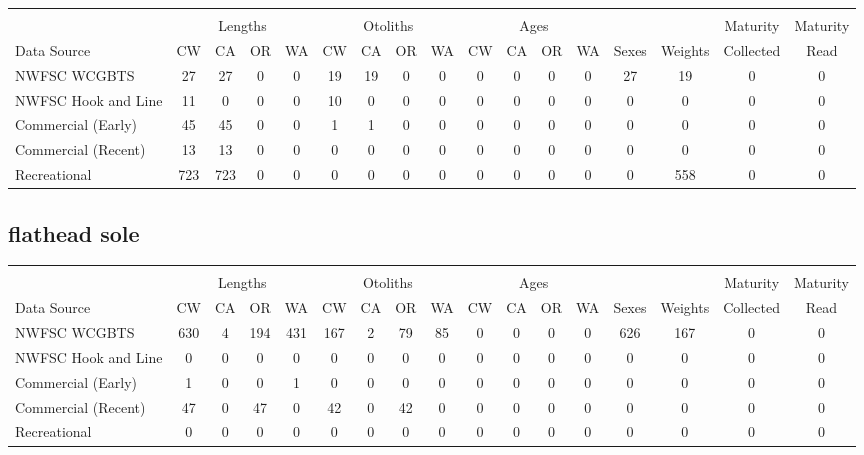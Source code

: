 \documentclass[12pt,]{article}
\begin{document}
\begin{table}[ht]
\centering
\begingroup\fontsize{10pt}{10pt}\selectfont
\begin{tabular}{|l|cccc|cccc|cccc|c|c|c|c|}
  \hline
 &  &  &  &  &  &  &  &  &  &  &  &  &  &  &  &  \\ 
   & \multicolumn{4}{c}{Lengths} &  \multicolumn{4}{c}{Otoliths} & \multicolumn{4}{c}{Ages} &  & & Maturity & Maturity\\
 Data Source & CW & CA & OR & WA & CW & CA & OR & WA & CW & CA & OR & WA & Sexes & Weights & Collected & Read\\
 \hline
NWFSC WCGBTS & 27 & 27 & 0 & 0 & 19 & 19 & 0 & 0 & 0 & 0 & 0 & 0 & 27 & 19 & 0 & 0 \\ 
  NWFSC Hook and Line & 11 & 0 & 0 & 0 & 10 & 0 & 0 & 0 & 0 & 0 & 0 & 0 & 0 & 0 & 0 & 0 \\ 
  Commercial (Early) & 45 & 45 & 0 & 0 & 1 & 1 & 0 & 0 & 0 & 0 & 0 & 0 & 0 & 0 & 0 & 0 \\ 
  Commercial (Recent) & 13 & 13 & 0 & 0 & 0 & 0 & 0 & 0 & 0 & 0 & 0 & 0 & 0 & 0 & 0 & 0 \\ 
  Recreational & 723 & 723 & 0 & 0 & 0 & 0 & 0 & 0 & 0 & 0 & 0 & 0 & 0 & 558 & 0 & 0 \\ 
   \hline
\end{tabular}
\endgroup
\end{table}

\FloatBarrier  

\newpage  

\subsection{flathead sole}\label{flathead-sole}

\begin{table}[ht]
\centering
\begingroup\fontsize{10pt}{10pt}\selectfont
\begin{tabular}{|l|cccc|cccc|cccc|c|c|c|c|}
  \hline
 &  &  &  &  &  &  &  &  &  &  &  &  &  &  &  &  \\ 
   & \multicolumn{4}{c}{Lengths} &  \multicolumn{4}{c}{Otoliths} & \multicolumn{4}{c}{Ages} &  & & Maturity & Maturity\\
 Data Source & CW & CA & OR & WA & CW & CA & OR & WA & CW & CA & OR & WA & Sexes & Weights & Collected & Read\\
 \hline
NWFSC WCGBTS & 630 & 4 & 194 & 431 & 167 & 2 & 79 & 85 & 0 & 0 & 0 & 0 & 626 & 167 & 0 & 0 \\ 
  NWFSC Hook and Line & 0 & 0 & 0 & 0 & 0 & 0 & 0 & 0 & 0 & 0 & 0 & 0 & 0 & 0 & 0 & 0 \\ 
  Commercial (Early) & 1 & 0 & 0 & 1 & 0 & 0 & 0 & 0 & 0 & 0 & 0 & 0 & 0 & 0 & 0 & 0 \\ 
  Commercial (Recent) & 47 & 0 & 47 & 0 & 42 & 0 & 42 & 0 & 0 & 0 & 0 & 0 & 0 & 0 & 0 & 0 \\ 
  Recreational & 0 & 0 & 0 & 0 & 0 & 0 & 0 & 0 & 0 & 0 & 0 & 0 & 0 & 0 & 0 & 0 \\ 
   \hline
\end{tabular}
\endgroup
\end{table}
\end{document}
